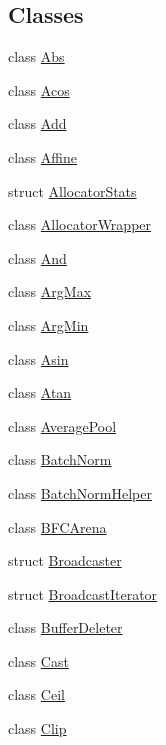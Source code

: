 \subsection*{Classes}
\begin{DoxyCompactItemize}
\item 
class \mbox{\hyperlink{classonnxruntime_1_1Abs}{Abs}}
\item 
class \mbox{\hyperlink{classonnxruntime_1_1Acos}{Acos}}
\item 
class \mbox{\hyperlink{classonnxruntime_1_1Add}{Add}}
\item 
class \mbox{\hyperlink{classonnxruntime_1_1Affine}{Affine}}
\item 
struct \mbox{\hyperlink{structonnxruntime_1_1AllocatorStats}{Allocator\+Stats}}
\item 
class \mbox{\hyperlink{classonnxruntime_1_1AllocatorWrapper}{Allocator\+Wrapper}}
\item 
class \mbox{\hyperlink{classonnxruntime_1_1And}{And}}
\item 
class \mbox{\hyperlink{classonnxruntime_1_1ArgMax}{Arg\+Max}}
\item 
class \mbox{\hyperlink{classonnxruntime_1_1ArgMin}{Arg\+Min}}
\item 
class \mbox{\hyperlink{classonnxruntime_1_1Asin}{Asin}}
\item 
class \mbox{\hyperlink{classonnxruntime_1_1Atan}{Atan}}
\item 
class \mbox{\hyperlink{classonnxruntime_1_1AveragePool}{Average\+Pool}}
\item 
class \mbox{\hyperlink{classonnxruntime_1_1BatchNorm}{Batch\+Norm}}
\item 
class \mbox{\hyperlink{classonnxruntime_1_1BatchNormHelper}{Batch\+Norm\+Helper}}
\item 
class \mbox{\hyperlink{classonnxruntime_1_1BFCArena}{B\+F\+C\+Arena}}
\item 
struct \mbox{\hyperlink{structonnxruntime_1_1Broadcaster}{Broadcaster}}
\item 
struct \mbox{\hyperlink{structonnxruntime_1_1BroadcastIterator}{Broadcast\+Iterator}}
\item 
class \mbox{\hyperlink{classonnxruntime_1_1BufferDeleter}{Buffer\+Deleter}}
\item 
class \mbox{\hyperlink{classonnxruntime_1_1Cast}{Cast}}
\item 
class \mbox{\hyperlink{classonnxruntime_1_1Ceil}{Ceil}}
\item 
class \mbox{\hyperlink{classonnxruntime_1_1Clip}{Clip}}

\end{DoxyCompactItemize}
